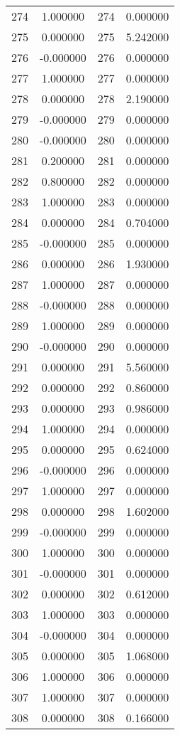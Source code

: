 \documentclass[12pt]{article}
\begin{document}
\begin{longtable}{@{}cccc@{}}
274 & 1.000000 & 274 & 0.000000 \\
275 & 0.000000 & 275 & 5.242000 \\
276 & -0.000000 & 276 & 0.000000 \\
277 & 1.000000 & 277 & 0.000000 \\
278 & 0.000000 & 278 & 2.190000 \\
279 & -0.000000 & 279 & 0.000000 \\
280 & -0.000000 & 280 & 0.000000 \\
281 & 0.200000 & 281 & 0.000000 \\
282 & 0.800000 & 282 & 0.000000 \\
283 & 1.000000 & 283 & 0.000000 \\
284 & 0.000000 & 284 & 0.704000 \\
285 & -0.000000 & 285 & 0.000000 \\
286 & 0.000000 & 286 & 1.930000 \\
287 & 1.000000 & 287 & 0.000000 \\
288 & -0.000000 & 288 & 0.000000 \\
289 & 1.000000 & 289 & 0.000000 \\
290 & -0.000000 & 290 & 0.000000 \\
291 & 0.000000 & 291 & 5.560000 \\
292 & 0.000000 & 292 & 0.860000 \\
293 & 0.000000 & 293 & 0.986000 \\
294 & 1.000000 & 294 & 0.000000 \\
295 & 0.000000 & 295 & 0.624000 \\
296 & -0.000000 & 296 & 0.000000 \\
297 & 1.000000 & 297 & 0.000000 \\
298 & 0.000000 & 298 & 1.602000 \\
299 & -0.000000 & 299 & 0.000000 \\
300 & 1.000000 & 300 & 0.000000 \\
301 & -0.000000 & 301 & 0.000000 \\
302 & 0.000000 & 302 & 0.612000 \\
303 & 1.000000 & 303 & 0.000000 \\
304 & -0.000000 & 304 & 0.000000 \\
305 & 0.000000 & 305 & 1.068000 \\
306 & 1.000000 & 306 & 0.000000 \\
307 & 1.000000 & 307 & 0.000000 \\
308 & 0.000000 & 308 & 0.166000 \\

\end{longtable}
\end{document}
